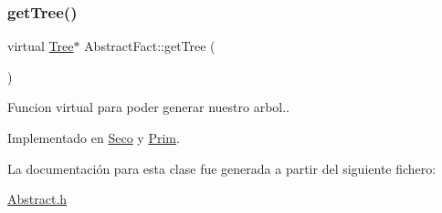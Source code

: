 \subsubsection{\texorpdfstring{get\+Tree()}{getTree()}}
{\footnotesize\ttfamily virtual \hyperlink{classTree}{Tree}$\ast$ Abstract\+Fact\+::get\+Tree (\begin{DoxyParamCaption}{ }\end{DoxyParamCaption})\hspace{0.3cm}{\ttfamily [pure virtual]}}

Funcion virtual para poder generar nuestro arbol.. 

Implementado en \hyperlink{classSeco_ae4a078cccba29b3d89dcb62b6eeaa269}{Seco} y \hyperlink{classPrim_aeccbb4f2821f8bc508647e2f6dd95370}{Prim}.



La documentación para esta clase fue generada a partir del siguiente fichero\+:\begin{DoxyCompactItemize}
\item 
\hyperlink{Abstract_8h}{Abstract.\+h}\end{DoxyCompactItemize}
